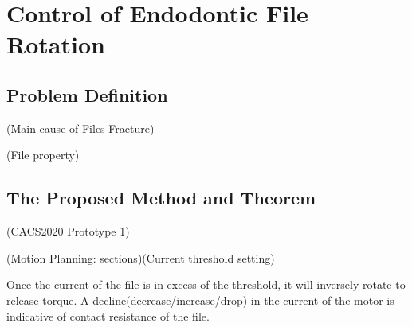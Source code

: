 \chapter{Control of Endodontic File Rotation}
\section{Problem Definition}
(Main cause of Files Fracture)					
\par\noindent
(File property)
\section{The Proposed Method and Theorem}
(CACS2020 Prototype 1)							
\par\noindent
(Motion Planning: sections)(Current threshold setting)
\par\noindent
Once the current of the file is in excess of the threshold, it will inversely rotate to release torque. A decline(decrease/increase/drop) in the current of the motor is indicative of contact resistance of the file.